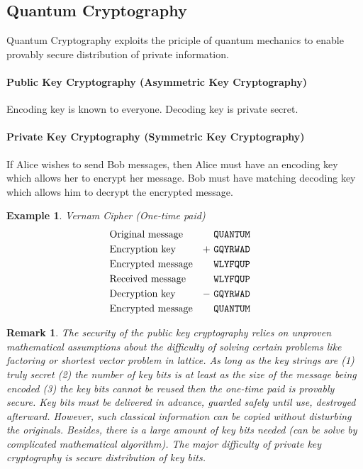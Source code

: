 \documentclass[]{book}
\newtheorem*{remark}{Remark}
\newtheorem*{example}{Example}
\theoremstyle{nonumberplain}
\begin{document}
\subsection{Quantum Cryptography}
Quantum Cryptography exploits the priciple of quantum mechanics to enable provably secure distribution of private information. 
\paragraph{Public Key Cryptography (Asymmetric Key Cryptography)}
Encoding key is known to everyone. Decoding key is private secret. 
\paragraph{Private Key Cryptography (Symmetric Key Cryptography)}
If Alice wishes to send Bob messages, then Alice must have an encoding key which allows her to encrypt her message. Bob must have matching decoding key which allows him to decrypt the encrypted message. 
\begin{example}
    Vernam Cipher (One-time paid)
    \[
    \begin{aligned}
        & \text{\rm Original message} & &\textup{\texttt{QUANTUM}}& \\
        & \text{\rm Encryption key}    & +\ &\textup{\texttt{GQYRWAD}}& \\
        & \text{\rm Encrypted message} & &\textup{\texttt{WLYFQUP}}& \\
        & \text{\rm Received message} & &\textup{\texttt{WLYFQUP}}& \\
        & \text{\rm Decryption key}    & -\ &\textup{\texttt{GQYRWAD}}& \\
        & \text{\rm Encrypted message} & &\textup{\texttt{QUANTUM}}&
    \end{aligned}\]
\end{example}

\begin{remark}
The security of the public key cryptography relies on unproven mathematical assumptions about the difficulty of solving certain problems like factoring or shortest vector problem in lattice. As long as the key strings are (1) \emph{truly secret} (2) \emph{the number of key bits is at least as the size of the message being encoded} (3) \emph{the key bits cannot be reused} then the one-time paid is provably secure. Key bits must be delivered in advance, guarded safely until use, destroyed afterward. However, such classical information can be copied without disturbing the originals. Besides, there is a large amount of key bits needed (can be solve by complicated mathematical algorithm). The major difficulty of private key cryptography is secure distribution of key bits.
\end{remark}
\end{document}
